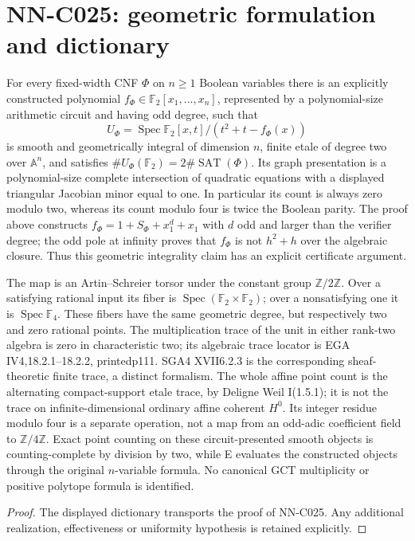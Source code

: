 \section{NN-C025: geometric formulation and dictionary}
\begin{geometricstatement}[NN-C025]
For every fixed-width CNF $\Phi$ on $n\geq1$ Boolean variables there is an explicitly constructed polynomial $f_\Phi\in\mathbb F_2[x_1,\ldots,x_n]$, represented by a polynomial-size arithmetic circuit and having odd degree, such that
\[
 U_\Phi=\operatorname{Spec}\mathbb F_2[x,t]/(t^2+t-f_\Phi(x))
\]
is smooth and geometrically integral of dimension $n$, finite etale of degree two over $\mathbb A^n$, and satisfies $\#U_\Phi(\mathbb F_2)=2\#\operatorname{SAT}(\Phi)$. Its graph presentation is a polynomial-size complete intersection of quadratic equations with a displayed triangular Jacobian minor equal to one. In particular its count is always zero modulo two, whereas its count modulo four is twice the Boolean parity. The proof above constructs $f_\Phi=1+S_\Phi+x_1^d+x_1$ with $d$ odd and larger than the verifier degree; the odd pole at infinity proves that $f_\Phi$ is not $h^2+h$ over the algebraic closure. Thus this geometric integrality claim has an explicit certificate argument.

The map is an Artin--Schreier torsor under the constant group $\mathbb Z/2\mathbb Z$. Over a satisfying rational input its fiber is $\operatorname{Spec}(\mathbb F_2\times\mathbb F_2)$; over a nonsatisfying one it is $\operatorname{Spec}\mathbb F_4$. These fibers have the same geometric degree, but respectively two and zero rational points. The multiplication trace of the unit in either rank-two algebra is zero in characteristic two; its algebraic trace locator is EGA IV4,18.2.1--18.2.2, printedp111. SGA4 XVII6.2.3 is the corresponding sheaf-theoretic finite trace, a distinct formalism. The whole affine point count is the alternating compact-support etale trace, by Deligne Weil I(1.5.1); it is not the trace on infinite-dimensional ordinary affine coherent $H^0$. Its integer residue modulo four is a separate operation, not a map from an odd-adic coefficient field to $\mathbb Z/4\mathbb Z$. Exact point counting on these circuit-presented smooth objects is counting-complete by division by two, while E evaluates the constructed objects through the original $n$-variable formula. No canonical GCT multiplicity or positive polytope formula is identified.
\end{geometricstatement}
\begin{proof} The displayed dictionary transports the proof of NN-C025. Any additional realization, effectiveness or uniformity hypothesis is retained explicitly.\end{proof}


